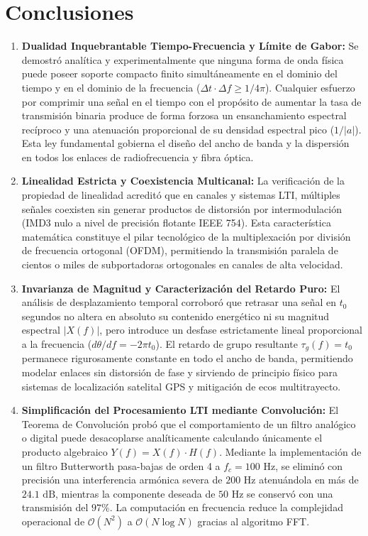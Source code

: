 \documentclass[11pt,a4paper]{article}
\begin{document}
\section{Conclusiones}

\begin{enumerate}[label=\textbf{\arabic*.}]
  \item \textbf{Dualidad Inquebrantable Tiempo-Frecuencia y L\'imite de Gabor:}
  Se demostr\'o anal\'itica y experimentalmente que ninguna forma de onda f\'isica puede poseer soporte compacto finito simult\'aneamente en el dominio del tiempo y en el dominio de la frecuencia ($\Delta t \cdot \Delta f \ge 1/4\pi$). Cualquier esfuerzo por comprimir una se\~nal en el tiempo con el prop\'osito de aumentar la tasa de transmisi\'on binaria produce de forma forzosa un ensanchamiento espectral rec\'iproco y una atenuaci\'on proporcional de su densidad espectral pico ($1/|a|$). Esta ley fundamental gobierna el dise\~no del ancho de banda y la dispersi\'on en todos los enlaces de radiofrecuencia y fibra \'optica.

  \item \textbf{Linealidad Estricta y Coexistencia Multicanal:}
  La verificaci\'on de la propiedad de linealidad acredit\'o que en canales y sistemas LTI, m\'ultiples se\~nales coexisten sin generar productos de distorsi\'on por intermodulaci\'on (IMD3 nulo a nivel de precisi\'on flotante IEEE 754). Esta caracter\'istica matem\'atica constituye el pilar tecnol\'ogico de la multiplexaci\'on por divisi\'on de frecuencia ortogonal (OFDM), permitiendo la transmisi\'on paralela de cientos o miles de subportadoras ortogonales en canales de alta velocidad.

  \item \textbf{Invarianza de Magnitud y Caracterizaci\'on del Retardo Puro:}
  El an\'alisis de desplazamiento temporal corrobor\'o que retrasar una se\~nal en $t_0$ segundos no altera en absoluto su contenido energ\'etico ni su magnitud espectral $|X(f)|$, pero introduce un desfase estrictamente lineal proporcional a la frecuencia ($d\theta/df = -2\pi t_0$). El retardo de grupo resultante $\tau_g(f) = t_0$ permanece rigurosamente constante en todo el ancho de banda, permitiendo modelar enlaces sin distorsi\'on de fase y sirviendo de principio f\'isico para sistemas de localizaci\'on satelital GPS y mitigaci\'on de ecos multitrayecto.

  \item \textbf{Simplificaci\'on del Procesamiento LTI mediante Convoluci\'on:}
  El Teorema de Convoluci\'on prob\'o que el comportamiento de un filtro anal\'ogico o digital puede desacoplarse anal\'iticamente calculando \'unicamente el producto algebraico $Y(f) = X(f) \cdot H(f)$. Mediante la implementaci\'on de un filtro Butterworth pasa-bajas de orden 4 a $f_c = 100\text{ Hz}$, se elimin\'o con precisi\'on una interferencia arm\'onica severa de $200\text{ Hz}$ atenu\'andola en m\'as de $24.1\text{ dB}$, mientras la componente deseada de $50\text{ Hz}$ se conserv\'o con una transmisi\'on del $97\%$. La computaci\'on en frecuencia reduce la complejidad operacional de $\mathcal{O}(N^2)$ a $\mathcal{O}(N \log N)$ gracias al algoritmo FFT.


\end{enumerate}
\end{document}

